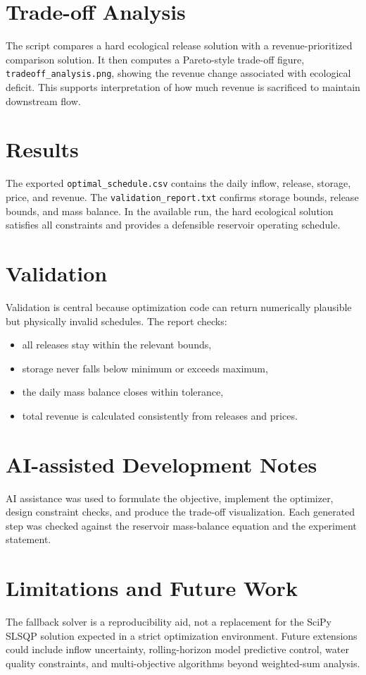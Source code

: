 \documentclass[11pt]{article}
\begin{document}
\section*{Trade-off Analysis}
The script compares a hard ecological release solution with a revenue-prioritized comparison solution. It then computes a Pareto-style trade-off figure, \texttt{tradeoff\_analysis.png}, showing the revenue change associated with ecological deficit. This supports interpretation of how much revenue is sacrificed to maintain downstream flow.

\section*{Results}
The exported \texttt{optimal\_schedule.csv} contains the daily inflow, release, storage, price, and revenue. The \texttt{validation\_report.txt} confirms storage bounds, release bounds, and mass balance. In the available run, the hard ecological solution satisfies all constraints and provides a defensible reservoir operating schedule.

\section*{Validation}
Validation is central because optimization code can return numerically plausible but physically invalid schedules. The report checks:
\begin{itemize}
  \item all releases stay within the relevant bounds,
  \item storage never falls below minimum or exceeds maximum,
  \item the daily mass balance closes within tolerance,
  \item total revenue is calculated consistently from releases and prices.
\end{itemize}

\section*{AI-assisted Development Notes}
AI assistance was used to formulate the objective, implement the optimizer, design constraint checks, and produce the trade-off visualization. Each generated step was checked against the reservoir mass-balance equation and the experiment statement.

\section*{Limitations and Future Work}
The fallback solver is a reproducibility aid, not a replacement for the SciPy SLSQP solution expected in a strict optimization environment. Future extensions could include inflow uncertainty, rolling-horizon model predictive control, water quality constraints, and multi-objective algorithms beyond weighted-sum analysis.
\end{document}
